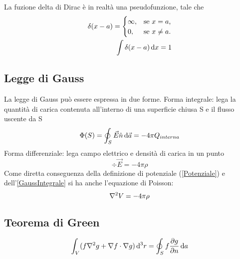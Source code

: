 \documentclass[../main.tex]{subfiles}
\begin{document}
\begin{definition}
La fuzione delta di Dirac \`e in realt\`a una pseudofunzione, tale che
  \begin{subequations}
    \label{DeltaDirac}
    \begin{align}
      \delta(x-a)=
      \begin{cases}
	\infty,	& \text{se $x=a$,} \\
	0, 	& \text{se $x \neq a$.}
      \end{cases}\\
      \int \delta (x-a) \,\mathrm d x =1
    \end{align}
  \end{subequations}
\end{definition}

\subsection{Legge di Gauss}\label{Gauss}
La legge di Gauss pu\`o essere espressa in due forme.\newline
Forma integrale: lega la quantit\`a di carica contenuta all'interno di una superficie chiusa S e il flusso uscente da S
\begin{equation}
  \label{GaussIntegrale}
  \Phi(S)= \oint_S \vec E \hat n \,\mathrm d \vec a=-4\pi Q_{interna}
\end{equation}
Forma differenziale: lega campo elettrico e densit\`a di carica in un punto 
\begin{equation}
  \label{GaussDifferenziale}
  \div \vec E=-4\pi\rho
\end{equation}
Come diretta conseguenza della definizione di potenziale (\cref{Potenziale}) e dell'\cref{GaussIntegrale} si ha anche l'equazione di Poisson:
\begin{equation}
  \label{Poisson}
  \nabla^2 V= -4\pi \rho
\end{equation}

\subsection{Teorema di Green}\label{Green}
\begin{theorem}
  \label{Green1}
  \begin{equation}
  \int_V (f \nabla^2 g + \nabla f \cdot \nabla g) \,\mathrm d^3 r = \oint_S f \frac{\partial g}{\partial n} \,\mathrm d a
  \end{equation}
\end{theorem}
\end{document}
